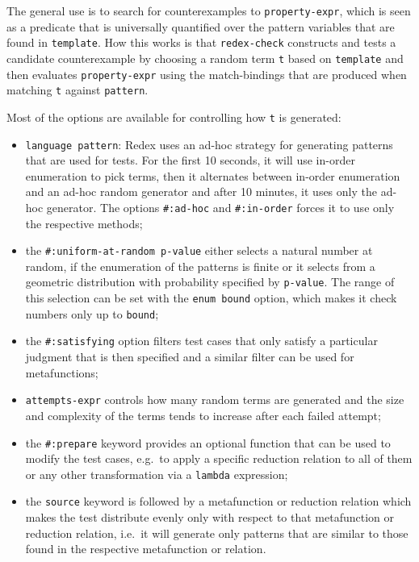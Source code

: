 The general use is to search for counterexamples to
\texttt{property-expr}, which is seen as a predicate that is universally
quantified over the pattern variables that are found in \texttt{template}.
How this works is that \texttt{redex-check} constructs and tests a
candidate counterexample by choosing a random term \texttt{t} based on
\texttt{template} and then evaluates \texttt{property-expr} using the
match-bindings that are produced when matching \texttt{t} against
\texttt{pattern}.

Most of the options are available for controlling how \texttt{t} is generated:
\begin{itemize}
\item \texttt{language pattern}: Redex uses an ad-hoc strategy for generating
  patterns that are used for tests. For the first 10 seconds, it will use in-order
  enumeration to pick terms, then it alternates between in-order enumeration and
  an ad-hoc random generator and after 10 minutes, it uses only the ad-hoc generator.
  The options \texttt{\#:ad-hoc} and \texttt{\#:in-order} forces it to use only
  the respective methods;
\item the \texttt{\#:uniform-at-random p-value} either selects a natural number
  at random, if the enumeration of the patterns is finite or it selects from
  a geometric distribution with probability specified by \texttt{p-value}. The
  range of this selection can be set with the \texttt{\:enum bound} option, which
  makes it check numbers only up to \texttt{bound};
\item the \texttt{\#:satisfying} option filters test cases that only satisfy
  a particular judgment that is then specified and a similar filter can be used
  for metafunctions;
\item \texttt{attempts-expr} controls how many random terms are generated
  and the size and complexity of the terms tends to increase after each
  failed attempt;
\item the \texttt{\#:prepare} keyword provides an optional function that can
  be used to modify the test cases, e.g.\ to apply a specific reduction relation
  to all of them or any other transformation via a \texttt{lambda} expression;
\item the \texttt{\:source} keyword is followed by a metafunction or reduction
  relation which makes the test distribute evenly only with respect to that
  metafunction or reduction relation, i.e.\ it will generate only patterns that
  are similar to those found in the respective metafunction or relation.
\end{itemize}



